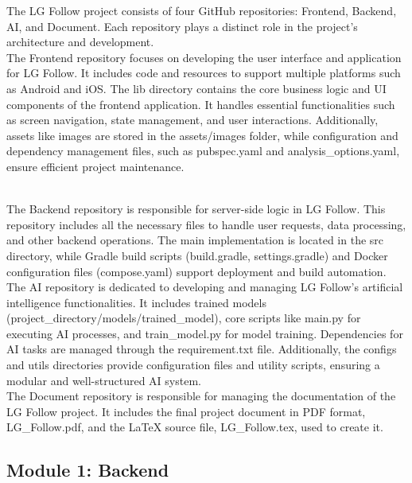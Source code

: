 \documentclass[conference]{IEEEtran}
\begin{document}
The LG Follow project consists of four GitHub repositories: Frontend, Backend, AI, and Document. Each repository plays a distinct role in the project’s architecture and development.\\

The Frontend repository focuses on developing the user interface and application for LG Follow. It includes code and resources to support multiple platforms such as Android and iOS. The lib directory contains the core business logic and UI components of the frontend application. It handles essential functionalities such as screen navigation, state management, and user interactions. Additionally, assets like images are stored in the assets/images folder, while configuration and dependency management files, such as pubspec.yaml and analysis\_options.yaml, ensure efficient project maintenance.\\
\

The Backend repository is responsible for server-side logic in LG Follow. This repository includes all the necessary files to handle user requests, data processing, and other backend operations. The main implementation is located in the src directory, while Gradle build scripts (build.gradle, settings.gradle) and Docker configuration files (compose.yaml) support deployment and build automation.\\

The AI repository is dedicated to developing and managing LG Follow’s artificial intelligence functionalities. It includes trained models (project\_directory/models/trained\_model), core scripts like main.py for executing AI processes, and train\_model.py for model training. Dependencies for AI tasks are managed through the requirement.txt file. Additionally, the configs and utils directories provide configuration files and utility scripts, ensuring a modular and well-structured AI system.\\

The Document repository is responsible for managing the documentation of the LG Follow project. It includes the final project document in PDF format, LG\_Follow.pdf, and the LaTeX source file, LG\_Follow.tex, used to create it.\\

\subsection{Module 1: Backend}
\end{document}
